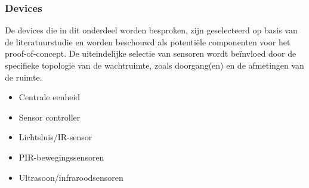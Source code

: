
\subsubsection{Devices}
De devices die in dit onderdeel worden besproken, zijn geselecteerd op basis van de literatuurstudie en worden beschouwd als potentiële componenten voor het proof-of-concept. De uiteindelijke selectie van sensoren wordt beïnvloed door de specifieke topologie van de wachtruimte, zoals doorgang(en) en de afmetingen van de ruimte. 

\begin{itemize}
    \item Centrale eenheid
    \item Sensor controller
    \item Lichtsluis/IR-sensor
    \item PIR-bewegingssensoren
    \item Ultrasoon/infraroodsensoren
\end{itemize}
\clearpage

